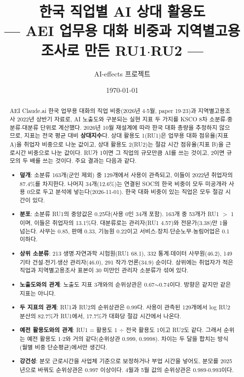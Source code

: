 \documentclass[11pt]{article}
\title{한국 직업별 AI 상대 활용도\\[2mm]
\large --- AEI 업무용 대화 비중과 지역별고용조사로 만든 RU1$\cdot$RU2 ---}
\author{AI-effects 프로젝트}
\date{\today}
\begin{document}
\maketitle

\begin{abstract}
\noindent AEI Claude.ai 한국 업무용 대화의 직업 비중(2026년 4$\cdot$5월, paper 19$\cdot$23)과 지역별고용조사 2022년 상반기 자료로, AI 노출도와 구분되는 실현 지표 두 가지를 KSCO 8차 소분류$\cdot$중분류$\cdot$대분류 단위로 계산했다. 2026년 10월 재설계에 따라 한국 대화 총량을 추정하지 않으므로, 지표는 전국 평균 대비 \textbf{상대지수}다. 상대 활용도 1(RU1)은 업무용 대화 점유율(지표 A)을 취업자 비중으로 나눈 값이고, 상대 활용도 2(RU2)는 절감 시간 점유율(지표 B)을 근로시간 비중으로 나눈 값이다. RU가 1이면 그 직업의 규모만큼 AI를 쓰는 것이고, 2이면 규모의 두 배를 쓰는 것이다. 주요 결과는 다음과 같다.
\begin{itemize}[leftmargin=*]
  \item \textbf{덮개}: 소분류 163개(군인 제외) 중 129개에서 사용이 관측되고, 이들이 2022년 취업자의 87.4\%를 차지한다. 나머지 34개(12.6\%)는 연결된 SOC의 한국 비중이 모두 미공개라 사용 0으로 두고 분석에 넣는다(2026-11-01). 한국 대화 비중이 있는 직업은 모두 절감 시간이 있다.
  \item \textbf{분포}: 소분류 RU1의 중앙값은 0.25다(사용 0인 34개 포함). 163개 중 53개가 RU1 $>$ 1이며, 이들은 취업자의 13.1\%다. 대분류로는 관리자(RU1 4.57)와 전문가(3.38)만 1을 넘는다. 사무는 0.85, 판매 0.33, 기능원 0.22이고 서비스$\cdot$장치$\cdot$단순노무$\cdot$농림어업은 0.1 이하다.
  \item \textbf{상위 소분류}: 213 생명$\cdot$자연과학 시험원(RU1 68.1), 332 통계$\cdot$데이터 사무원(46.2), 149 기타 건설$\cdot$전기$\cdot$생산 관리자(46.0), 291 작가$\cdot$언론(34.9) 순이다. 상위에는 취업자가 적은 직업과 지역별고용조사 표본이 30 미만인 관리자 소분류가 섞여 있다.
  \item \textbf{노출도와의 관계}: 노출도 지표 3개와의 순위상관은 0.67$\sim$0.74이다. 방향은 같지만 같은 지표는 아니다.
  \item \textbf{두 지표의 관계}: RU1과 RU2의 순위상관은 0.99다. 사용이 관측된 129개에서 log RU2 분산의 82.7\%가 RU1에서, 17.7\%가 대화당 절감 시간에서 나온다.
  \item \textbf{예전 활용도와의 관계}: RU1 = 활용도 1 $\div$ 전국 활용도 1이고 RU2도 같다. 그래서 순위는 예전 활용도 1$\cdot$2와 거의 같다(순위상관 0.999, 0.9998). 차이는 두 달을 합치는 방식(월별 비중 단순평균)에서만 생긴다.
  \item \textbf{강건성}: 분모 근로시간을 사업체 기준으로 보정하거나 부업 시간을 넣어도, 분모를 2025년으로 바꿔도 순위상관은 0.997 이상이다. 4월과 5월 값의 순위상관은 0.989$\cdot$0.993이다.
\end{itemize}
\end{abstract}
\end{document}
